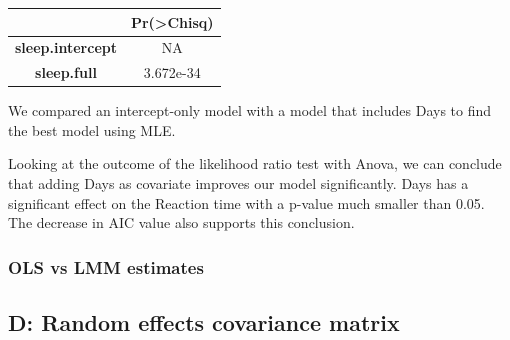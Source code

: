 \documentclass[
]{article}
\begin{document}
\begin{longtable}[]{@{}cc@{}}
\toprule
\begin{minipage}[b]{0.29\columnwidth}\centering
~\strut
\end{minipage} & \begin{minipage}[b]{0.17\columnwidth}\centering
Pr(\textgreater Chisq)\strut
\end{minipage}\tabularnewline
\midrule
\endhead
\begin{minipage}[t]{0.29\columnwidth}\centering
\textbf{sleep.intercept}\strut
\end{minipage} & \begin{minipage}[t]{0.17\columnwidth}\centering
NA\strut
\end{minipage}\tabularnewline
\begin{minipage}[t]{0.29\columnwidth}\centering
\textbf{sleep.full}\strut
\end{minipage} & \begin{minipage}[t]{0.17\columnwidth}\centering
3.672e-34\strut
\end{minipage}\tabularnewline
\bottomrule
\end{longtable}

We compared an intercept-only model with a model that includes Days to
find the best model using MLE.

Looking at the outcome of the likelihood ratio test with Anova, we can
conclude that adding Days as covariate improves our model significantly.
Days has a significant effect on the Reaction time with a p-value much
smaller than 0.05. The decrease in AIC value also supports this
conclusion.

\hypertarget{ols-vs-lmm-estimates}{%
\subsubsection{OLS vs LMM estimates}\label{ols-vs-lmm-estimates}}

\hypertarget{d-random-effects-covariance-matrix}{%
\subsection{D: Random effects covariance
matrix}\label{d-random-effects-covariance-matrix}}
\end{document}

